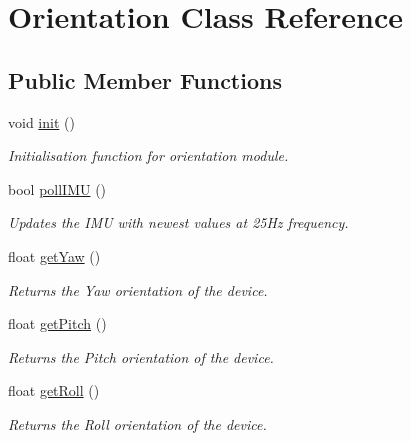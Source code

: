 \hypertarget{class_orientation}{}\section{Orientation Class Reference}
\label{class_orientation}
\subsection*{Public Member Functions}
\begin{DoxyCompactItemize}
\item 
void \hyperlink{class_orientation_a317461c5c8afa8c3abf56847d4544728}{init} ()
\begin{DoxyCompactList}\small\item\em Initialisation function for orientation module. \end{DoxyCompactList}\item 
bool \hyperlink{class_orientation_aad568a473f999c181abac46a4d832387}{poll\+I\+MU} ()
\begin{DoxyCompactList}\small\item\em Updates the I\+MU with newest values at 25\+Hz frequency. \end{DoxyCompactList}\item 
float \hyperlink{class_orientation_a3dbaa1ee014811c40d5b9f39b544c19b}{get\+Yaw} ()
\begin{DoxyCompactList}\small\item\em Returns the Yaw orientation of the device. \end{DoxyCompactList}\item 
float \hyperlink{class_orientation_a7ec1a2964fc858bbd5da22a505b087c8}{get\+Pitch} ()
\begin{DoxyCompactList}\small\item\em Returns the Pitch orientation of the device. \end{DoxyCompactList}\item 
float \hyperlink{class_orientation_ab8923432cb8c18822b0a9ae95a5ac505}{get\+Roll} ()
\begin{DoxyCompactList}\small\item\em Returns the Roll orientation of the device. \end{DoxyCompactList}\end{DoxyCompactItemize}
